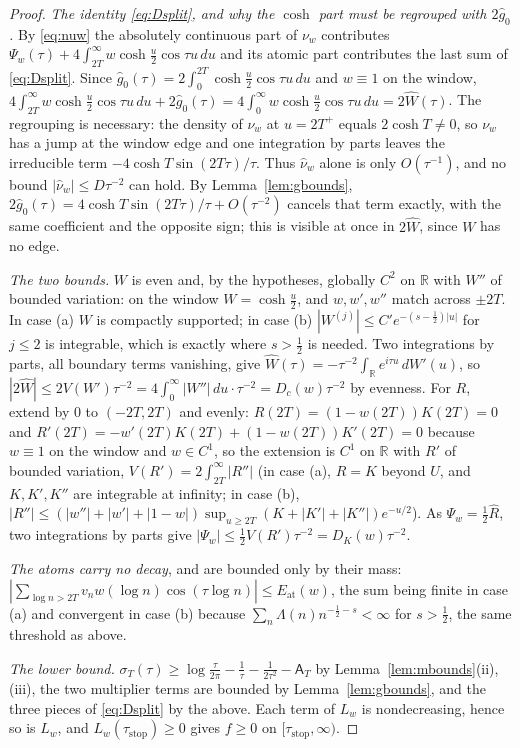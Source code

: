 \documentclass[11pt]{amsart}
\theoremstyle{definition}
\theoremstyle{remark}
\newcommand{\R}{\mathbb R}
\newcommand{\sT}{\sigma_T}
\newcommand{\gh}[1]{\widehat g_{#1}}
\newcommand{\nuh}{\widehat\nu}
\newcommand{\Aconst}{\mathsf A_T}
\begin{document}
\begin{proof}
\emph{The identity \eqref{eq:Dsplit}, and why the $\cosh$ part must be regrouped with $2\gh0$.}
By \eqref{eq:nuw} the absolutely continuous part of $\nu_w$ contributes
$\Psi_w(\tau)+4\int_{2T}^\infty w\cosh\frac u2\cos\tau u\,du$ and its atomic part contributes the
last sum of \eqref{eq:Dsplit}. Since $\gh0(\tau)=2\int_0^{2T}\cosh\frac u2\cos\tau u\,du$ and
$w\equiv1$ on the window, $4\int_{2T}^\infty w\cosh\frac u2\cos\tau u\,du+2\gh0(\tau)
=4\int_0^\infty w\cosh\frac u2\cos\tau u\,du=2\widehat W(\tau)$. The regrouping is necessary: the
density of $\nu_w$ at $u=2T^+$ equals $2\cosh T\ne0$, so $\nu_w$ has a jump at the window edge and
one integration by parts leaves the irreducible term $-4\cosh T\sin(2T\tau)/\tau$. Thus $\nuh_w$
alone is only $O(\tau^{-1})$, and no bound $|\nuh_w|\le D\tau^{-2}$ can hold. By
Lemma~\ref{lem:gbounds}, $2\gh0(\tau)=4\cosh T\sin(2T\tau)/\tau+O(\tau^{-2})$ cancels that term
exactly, with the same coefficient and the opposite sign; this is visible at once in
$2\widehat W$, since $W$ has no edge.

\emph{The two bounds.} $W$ is even and, by the hypotheses, globally $C^2$ on $\R$ with $W''$ of
bounded variation: on the window $W=\cosh\frac u2$, and $w,w',w''$ match across $\pm2T$. In case
(a) $W$ is compactly supported; in case (b) $|W^{(j)}|\le C'e^{-(s-\frac12)|u|}$ for $j\le2$ is
integrable, which is exactly where $s>\frac12$ is needed. Two integrations by parts, all boundary
terms vanishing, give $\widehat W(\tau)=-\tau^{-2}\int_\R e^{i\tau u}\,dW'(u)$, so
$|2\widehat W|\le2V(W')\tau^{-2}=4\int_0^\infty|W''|\,du\cdot\tau^{-2}=D_c(w)\tau^{-2}$ by evenness.
For $R$, extend by $0$ to $(-2T,2T)$ and evenly: $R(2T)=(1-w(2T))K(2T)=0$ and
$R'(2T)=-w'(2T)K(2T)+(1-w(2T))K'(2T)=0$ because $w\equiv1$ on the window and $w\in C^1$, so the
extension is $C^1$ on $\R$ with $R'$ of bounded variation, $V(R')=2\int_{2T}^\infty|R''|$ (in case
(a), $R=K$ beyond $U$, and $K,K',K''$ are integrable at infinity; in case (b),
$|R''|\le(|w''|+|w'|+|1-w|)\sup_{u\ge2T}(K+|K'|+|K''|)e^{-u/2}$). As $\Psi_w=\frac12\widehat R$,
two integrations by parts give $|\Psi_w|\le\frac12V(R')\tau^{-2}=D_K(w)\tau^{-2}$.

\emph{The atoms carry no decay}, and are bounded only by their mass:
$|\sum_{\log n>2T}v_nw(\log n)\cos(\tau\log n)|\le E_{\mathrm{at}}(w)$, the sum being finite in case
(a) and convergent in case (b) because $\sum_n\Lambda(n)n^{-\frac12-s}<\infty$ for $s>\frac12$,
the same threshold as above.

\emph{The lower bound.} $\sT(\tau)\ge\log\frac\tau{2\pi}-\frac1\tau-\frac1{2\tau^2}-\Aconst$ by
Lemma~\ref{lem:mbounds}(ii),(iii), the two multiplier terms are bounded by Lemma~\ref{lem:gbounds},
and the three pieces of \eqref{eq:Dsplit} by the above. Each term of $L_w$ is nondecreasing, hence so
is $L_w$, and $L_w(\tau_{\mathrm{stop}})\ge0$ gives $f\ge0$ on $[\tau_{\mathrm{stop}},\infty)$.
\end{proof}
\end{document}
